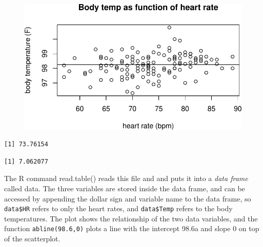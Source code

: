 \documentclass[
  letterpaper,
  DIV=11,
  numbers=noendperiod]{scrreprt}
\newenvironment{Shaded}{\begin{snugshade}}{\end{snugshade}}
\newcommand{\FunctionTok}[1]{\textcolor[rgb]{0.28,0.35,0.67}{#1}}
\newcommand{\NormalTok}[1]{\textcolor[rgb]{0.00,0.23,0.31}{#1}}
\newcommand{\SpecialCharTok}[1]{\textcolor[rgb]{0.37,0.37,0.37}{#1}}
\begin{document}
\begin{figure}[H]

{\centering \includegraphics{./descriptive_files/figure-pdf/unnamed-chunk-1-1.pdf}

}

\end{figure}

\begin{Shaded}
\end{Shaded}

\begin{verbatim}
[1] 73.76154
\end{verbatim}

\begin{Shaded}
\end{Shaded}

\begin{verbatim}
[1] 7.062077
\end{verbatim}

The R command read.table() reads this file and and puts it into a
\emph{data frame} called data. The three variables are stored inside the
data frame, and can be accessed by appending the dollar sign and
variable name to the data frame, so \texttt{data\$HR} refers to only the
heart rates, and \texttt{data\$Temp} refers to the body temperatures.
The plot shows the relationship of the two data variables, and the
function \texttt{abline(98.6,0)} plots a line with the intercept 98.6a
and slope 0 on top of the scatterplot.
\end{document}
